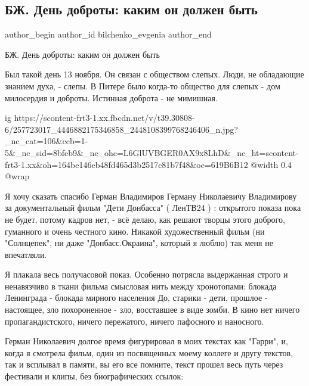  
 
 
 
 
 
\subsection{БЖ. День доброты: каким он должен быть}
\label{sec:16_11_2021.fb.bilchenko_evgenia.1.den_dobroty}
 
\ifcmt
 author_begin
   author_id bilchenko_evgenia
 author_end
\fi

БЖ. День доброты: каким он должен быть

Был такой день 13 ноября. Он связан с обществом слепых. Люди, не обладающие
знанием духа, - слепы. В Питере было когда-то общество для слепых - дом
милосердия и доброты. Истинная доброта - не мимишная.

\ifcmt
  ig https://scontent-frt3-1.xx.fbcdn.net/v/t39.30808-6/257723017_4446882175346858_2448108399768246406_n.jpg?_nc_cat=106&ccb=1-5&_nc_sid=8bfeb9&_nc_ohc=L6GlUVBGER0AX9x8LhD&_nc_ht=scontent-frt3-1.xx&oh=164be146eb48fd465d3b2517c81b7f48&oe=619B6B12
  @width 0.4
  @wrap 
\fi

Я хочу сказать спасибо Герман Владимиров Герману Николаевичу Владимирову за
документальный фильм "Дети Донбасса" ( ЛенТВ24 ) : открытого показа пока не будет,
потому кадров нет, - всё делаю, как решают творцы этого доброго, гуманного и
очень честного кино. Никакой художественный фильм (ни "Солнцепек", ни даже
"Донбасс.Окраина", который я люблю) так меня не впечатляли. 

Я плакала весь получасовой показ. Особенно потрясла выдержанная строго и
ненавязчиво в ткани фильма смысловая нить между хронотопами: блокада Ленинграда
- блокада мирного населения До, старики - дети, прошлое - настоящее, зло
похороненное - зло, восставшее в виде зомби. В кино нет ничего
пропагандистского, ничего пережатого, ничего пафосного и наносного. 

Герман Николаевич долгое время фигурировал в моих текстах как "Гарри", и, когда
я смотрела фильм, один из посвященных моему коллеге и другу текстов, так и
всплывал в памяти, вы его все помните, текст прошел весь путь через фестивали и
клипы, без биографических ссылок:

